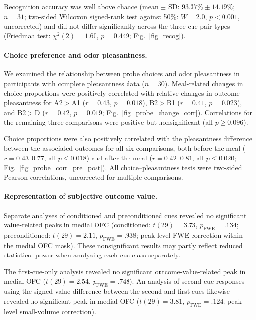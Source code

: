 \documentclass[9pt,twoside,lineno]{pnas-new}
\begin{document}
Recognition accuracy was well above chance (mean $\pm$ SD: $93.37\% \pm 14.19\%$; $n = 31$; two-sided Wilcoxon signed-rank test against 50\%: $W = 2.0$, $p < 0.001$, uncorrected) and did not differ significantly across the three cue-pair types (Friedman test: $\chi^2(2) = 1.60$, $p = 0.449$; Fig.~\ref{fig_recog}).

\paragraph*{Choice preference and odor pleasantness.}

We examined the relationship between probe choices and odor pleasantness in participants with complete pleasantness data ($n = 30$). Meal-related changes in choice proportions were positively correlated with relative changes in outcome pleasantness for A2$>$A1 ($r = 0.43$, $p = 0.018$), B2$>$B1 ($r = 0.41$, $p = 0.023$), and B2$>$D ($r = 0.42$, $p = 0.019$; Fig.~\ref{fig_probe_change_corr}). Correlations for the remaining three comparisons were positive but nonsignificant (all $p \geq 0.096$).

Choice proportions were also positively correlated with the pleasantness difference between the associated outcomes for all six comparisons, both before the meal ($r = 0.43$--$0.77$, all $p \leq 0.018$) and after the meal ($r = 0.42$--$0.81$, all $p \leq 0.020$; Fig.~\ref{fig_probe_corr_pre_post}). All choice--pleasantness tests were two-sided Pearson correlations, uncorrected for multiple comparisons.

\paragraph*{Representation of subjective outcome value.}

Separate analyses of conditioned and preconditioned cues revealed no significant value-related peaks in medial OFC (conditioned: $t(29)=3.73$, $p_{\mathrm{FWE}}=.134$; preconditioned: $t(29)=2.11$, $p_{\mathrm{FWE}}=.938$; peak-level FWE correction within the medial OFC mask). These nonsignificant results may partly reflect reduced statistical power when analyzing each cue class separately.

The first-cue-only analysis revealed no significant outcome-value-related peak in medial OFC ($t(29)=2.54$, $p_{\mathrm{FWE}}=.748$). An analysis of second-cue responses using the signed value difference between the second and first cues likewise revealed no significant peak in medial OFC ($t(29)=3.81$, $p_{\mathrm{FWE}}=.124$; peak-level small-volume correction).
\end{document}
